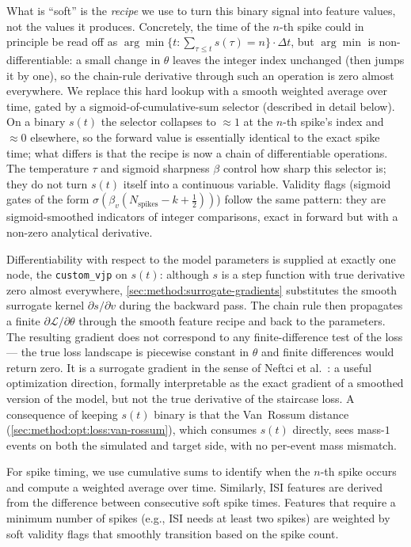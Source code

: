 What is ``soft'' is the \emph{recipe} we use to turn this binary signal into feature values, not the values it produces.
Concretely, the time of the $n$-th spike could in principle be read off as $\arg\min\{t : \sum_{\tau\leq t} s(\tau) = n\}\cdot\Delta t$,
but $\arg\min$ is non-differentiable: a small change in $\theta$ leaves the integer index unchanged (then jumps it by one),
so the chain-rule derivative through such an operation is zero almost everywhere.
We replace this hard lookup with a smooth weighted average over time, gated by a sigmoid-of-cumulative-sum selector (described in detail below).
On a binary $s(t)$ the selector collapses to $\approx\!1$ at the $n$-th spike's index and $\approx\!0$ elsewhere,
so the forward value is essentially identical to the exact spike time; what differs is that the recipe is now a chain of differentiable operations.
The temperature $\tau$ and sigmoid sharpness $\beta$ control how sharp this selector is; they do not turn $s(t)$ itself into a continuous variable.
Validity flags (sigmoid gates of the form $\sigma(\beta_v(N_{\text{spikes}}-k+\tfrac{1}{2}))$) follow the same pattern:
they are sigmoid-smoothed indicators of integer comparisons, exact in forward but with a non-zero analytical derivative.

Differentiability with respect to the model parameters is supplied at exactly one node, the \texttt{custom\_vjp} on $s(t)$:
although $s$ is a step function with true derivative zero almost everywhere,
\cref{sec:method:surrogate-gradients} substitutes the smooth surrogate kernel $\partial s/\partial v$ during the backward pass.
The chain rule then propagates a finite $\partial\mathcal{L}/\partial\theta$ through the smooth feature recipe and back to the parameters.
The resulting gradient does not correspond to any finite-difference test of the loss ---
the true loss landscape is piecewise constant in $\theta$ and finite differences would return zero.
It is a surrogate gradient in the sense of Neftci et al.~\cite{Neftci2019}: a useful optimization direction,
formally interpretable as the exact gradient of a smoothed version of the model, but not the true derivative of the staircase loss.
A consequence of keeping $s(t)$ binary is that the Van~Rossum distance (\cref{sec:method:opt:loss:van-rossum}),
which consumes $s(t)$ directly, sees mass-$1$ events on both the simulated and target side, with no per-event mass mismatch.

For spike timing, we use cumulative sums to identify when the $n$-th spike occurs and compute a weighted average over time.
Similarly, ISI features are derived from the difference between consecutive soft spike times.
Features that require a minimum number of spikes (e.g., ISI needs at least two spikes) are weighted by soft validity flags that smoothly transition based on the spike count.

